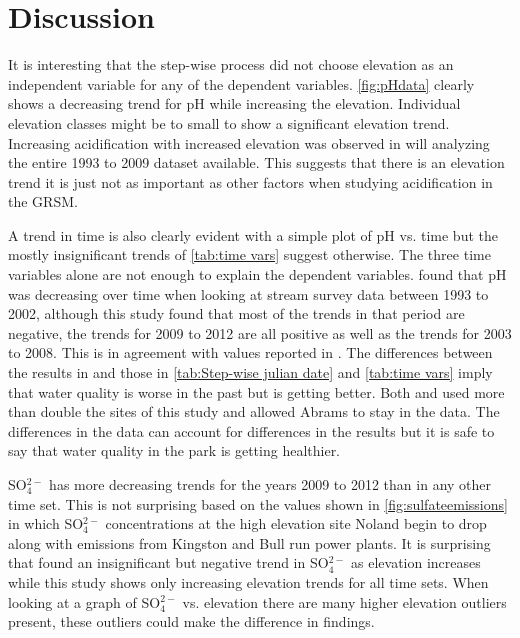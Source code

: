 \section{Discussion}
\label{sec:TADiscussion}

It is interesting that the step-wise process did not choose elevation as an independent variable for any of the dependent variables. 
\autoref{fig:pHdata} clearly shows a decreasing trend for pH while increasing the elevation. Individual elevation classes might be to small to show a significant elevation trend. 
 Increasing acidification with increased elevation was observed in \citet{cai2012} will analyzing the entire 1993 to 2009 dataset available.  
This suggests that there is an elevation trend it is just not as important as other factors when studying acidification in the GRSM.%

A trend in time is also clearly evident with a simple plot of pH vs. time but the mostly insignificant trends of \autoref{tab:time vars} suggest otherwise.
 The three time variables alone are not enough to explain the dependent variables. 
 \citet{robinson2008ph} found that pH was decreasing over time when looking at stream survey data between 1993 to 2002, although this study found that most of the trends in that period are negative, the trends for 2009 to 2012 are all positive as well as the trends for 2003 to 2008.  This is in agreement with values reported in \citet{cai2012}.  
The differences between the results in \citet{robinson2008ph} and those in \autoref{tab:Step-wise julian date} and \autoref{tab:time vars} imply that water quality is worse in the past but is getting better.  
Both \citet{robinson2008ph} and \citet{cai2012} used more than double the sites of this study and \citet{robinson2008ph} allowed Abrams to stay in the data.  
The differences in the data can account for differences in the results but it is safe to say that water quality in the park is getting healthier.

SO$_4^{2-}$ has more decreasing trends for the years 2009 to 2012 than in any other time set. 
This is not surprising based on the values shown in \autoref{fig:sulfateemissions} in which SO$_4^{2-}$ concentrations at the high elevation site Noland begin to drop along with emissions from Kingston and Bull run power plants. 
 It is surprising that \cite{cai2012} found an insignificant but negative trend in SO$_4^{2-}$ as elevation increases while this study shows only increasing elevation trends for all time sets.  
When looking at a graph of SO$_4^{2-}$ vs. elevation there are many higher elevation outliers present, these outliers could make the difference in findings.%

